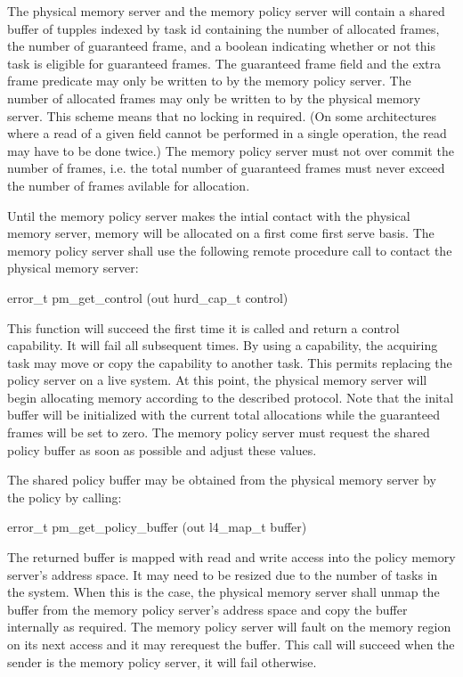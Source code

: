 The physical memory server and the memory policy server will contain a
shared buffer of tupples indexed by task id containing the number of
allocated frames, the number of guaranteed frame, and a boolean
indicating whether or not this task is eligible for guaranteed frames.
The guaranteed frame field and the extra frame predicate may only be
written to by the memory policy server.  The number of allocated frames
may only be written to by the physical memory server.  This scheme
means that no locking in required.  (On some architectures where a
read of a given field cannot be performed in a single operation, the
read may have to be done twice.)  The memory policy server must not
over commit the number of frames, i.e. the total number of guaranteed
frames must never exceed the number of frames avilable for allocation.

Until the memory policy server makes the intial contact with the
physical memory server, memory will be allocated on a first come first
serve basis.  The memory policy server shall use the following remote
procedure call to contact the physical memory server:

\begin{code}
error\_t pm\_get\_control (out hurd\_cap\_t control)
\end{code}

\noindent
This function will succeed the first time it is called and return a
control capability.  It will fail all subsequent times.  By using a
capability, the acquiring task may move or copy the capability to
another task.  This permits replacing the policy server on a live
system.  At this point, the physical memory server will begin
allocating memory according to the described protocol.  Note that the
inital buffer will be initialized with the current total allocations
while the guaranteed frames will be set to zero.  The memory policy
server must request the shared policy buffer as soon as possible and
adjust these values.

The shared policy buffer may be obtained from the physical memory
server by the policy by calling:

\begin{code}
error\_t pm\_get\_policy\_buffer (out l4\_map\_t buffer)
\end{code}

\noindent
The returned buffer is mapped with read and write access into the
policy memory server's address space.  It may need to be resized due
to the number of tasks in the system.  When this is the case, the
physical memory server shall unmap the buffer from the memory policy
server's address space and copy the buffer internally as required.
The memory policy server will fault on the memory region on its next
access and it may rerequest the buffer.  This call will succeed when
the sender is the memory policy server, it will fail otherwise.

